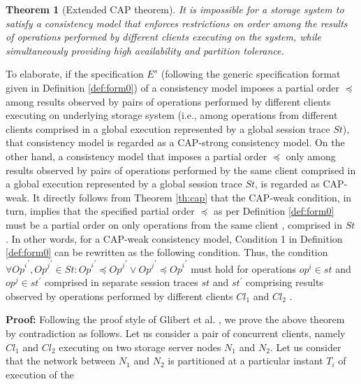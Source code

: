 \documentclass{sig-alternate-05-2015}
\newtheorem {theorem} {Theorem}
\begin{document}
\begin{theorem}[Extended CAP theorem] 
 It is impossible for a storage system to satisfy a consistency model that enforces restrictions on order  among the  results of operations performed by different clients executing on the system, while simultaneously providing high availability and partition tolerance. 
 \end{theorem} \label{th:cap}
 To elaborate, if the specification $E^s$ (following the generic specification format given in Definition \ref{def:form0}) of a consistency model imposes a partial order $\preccurlyeq$ among results observed by pairs of operations performed by different clients executing on underlying storage system (i.e., among  operations from different clients comprised in a global execution represented by a global session trace $\mathit{St}$), that consistency model is regarded as a CAP-strong consistency model. On the other hand, a consistency model that imposes a partial order $\preccurlyeq$ only among results observed by pairs of operations performed by the same client  comprised in a global execution represented by a global session trace $\mathit{St}$, is regarded as CAP-weak. It directly follows from Theorem \ref{th:cap} that the CAP-weak condition, in turn,
 implies that the specified partial order $\preccurlyeq$ as per Definition \ref{def:form0} must be a partial order on only operations from the same client , comprised in $\mathit{St}$. In other words, for a CAP-weak consistency model, Condition 1 in  Definition \ref{def:form0} can be rewritten as 
 the following condition.
  Thus, the condition $\forall {\mathit{Op}^i}^{'}, {\mathit{Op}^j}^{'} \in \mathit{St}: {\mathit{Op}^i}^{'} \preccurlyeq {\mathit{Op}^j}^{'} \vee {\mathit{Op}^j}^{'} \preccurlyeq {\mathit{Op}^i}^{'}$
 must hold for operations
  $\mathit{op}^i \in \mathit{st}$ and $\mathit{op}^j \in \mathit{st}^{'}$ comprised in separate session traces $\mathit{st}$ and $\mathit{st}^{'}$ comprising results observed by operations performed by different clients $\mathit{Cl}_1$ and $\mathit{Cl}_2$ . %
\par \textbf{Proof:} Following the proof style of Glibert et al.  \cite{Gilbert:2002:BCF:564585.564601},  we prove the above theorem by contradiction as follows.  Let us consider a pair of concurrent clients, namely $\mathit{Cl}_1$ and $\mathit{Cl}_2$ executing
on two storage server nodes $N_1$ and $N_2$.
Let us consider that the network between $N_1$ and $N_2$ is partitioned at a particular instant $T_i$ of execution of the
\end{document}
